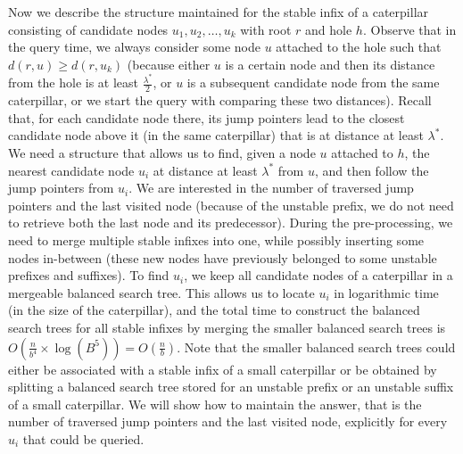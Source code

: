 \documentclass[11pt,a4paper]{article}
\theoremstyle{definition}
\theoremstyle{remark}
\begin{document}
Now we describe the structure maintained for the stable infix of a caterpillar consisting of
candidate nodes $u_{1},u_{2},\ldots,u_{k}$ with root $r$ and hole $h$. Observe that in the
query time, we always consider some node $u$ attached to the hole such that $d(r,u)\geq d(r,u_{k})$
(because either $u$ is a certain node and then its distance from the hole is at least
$\frac{\lambda^{*}}{2}$, or $u$ is a subsequent candidate node from the same caterpillar,
or we start the query with comparing these two distances).
Recall that, for each candidate node there, its jump pointers lead to the closest candidate node above it
(in the same caterpillar) that is at distance at least $\lambda ^*$. We need a structure
that allows us to find, given a node $u$ attached to $h$, the nearest candidate node $u_{i}$
at distance at least $\lambda^{*}$ from $u$, and then follow the jump pointers from $u_{i}$.
We are interested in the number of traversed jump pointers and the last visited node
(because of the unstable prefix, we do not need to retrieve both the last node
and its predecessor). During the pre-processing, we need to merge multiple stable infixes
into one, while possibly inserting some nodes in-between (these new nodes have previously
belonged to some unstable prefixes and suffixes). To find $u_{i}$, we keep all candidate
nodes of a caterpillar in a mergeable balanced search tree. This allows us to locate $u_{i}$
in logarithmic time (in the size of the caterpillar), and the total time to construct the balanced
search trees for all stable infixes by merging the smaller balanced search trees
is $O(\frac{n}{b^{4}}\times \log (B^{5}))=O(\frac{n}{b})$. Note that the smaller balanced search
trees could either be associated with a stable infix of a small caterpillar or be obtained
by splitting a balanced search tree stored for an unstable prefix or an unstable suffix of
a small caterpillar.
We will show how to maintain the answer, that is the number of traversed jump pointers and the
last visited node, explicitly for every $u_{i}$ that could be queried.
\end{document}
